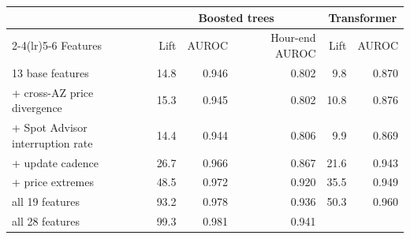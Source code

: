 \begin{tabular}{lrrrrr}
\toprule
& \multicolumn{3}{c}{Boosted trees} & \multicolumn{2}{c}{Transformer} \\
\cmidrule(lr){2-4}\cmidrule(lr){5-6}
Features & Lift & AUROC & Hour-end AUROC & Lift & AUROC \\
\midrule
13 base features & 14.8 & 0.946 & 0.802 & 9.8 & 0.870 \\
+ cross-AZ price divergence & 15.3 & 0.945 & 0.802 & 10.8 & 0.876 \\
+ Spot Advisor interruption rate & 14.4 & 0.944 & 0.806 & 9.9 & 0.869 \\
+ update cadence & 26.7 & 0.966 & 0.867 & 21.6 & 0.943 \\
+ price extremes & 48.5 & 0.972 & 0.920 & 35.5 & 0.949 \\
all 19 features & 93.2 & 0.978 & 0.936 & 50.3 & 0.960 \\
all 28 features & 99.3 & 0.981 & 0.941 & &  \\
\bottomrule
\end{tabular}
